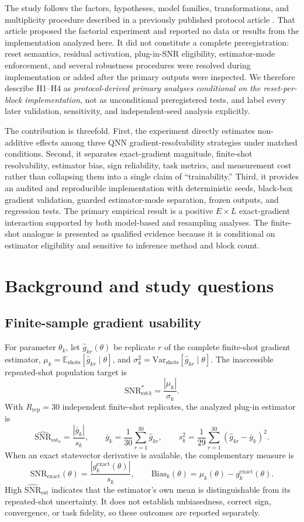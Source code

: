 \documentclass[pdflatex,sn-basic,Numbered]{sn-jnl}
\newcommand{\snrstar}{\mathrm{SNR}^{*}_{\mathrm{est}}}
\newcommand{\snrest}{\widehat{\mathrm{SNR}}_{\mathrm{est}}}
\newcommand{\snrexact}{\mathrm{SNR}_{\mathrm{exact}}}
\begin{document}
The study follows the factors, hypotheses, model families, transformations, and multiplicity procedure described in a previously published protocol article \cite{shen2026gradient}. That article proposed the factorial experiment and reported no data or results from the implementation analyzed here. It did not constitute a complete preregistration: reset semantics, residual activation, plug-in-SNR eligibility, estimator-mode enforcement, and several robustness procedures were resolved during implementation or added after the primary outputs were inspected. We therefore describe H1--H4 as \emph{protocol-derived primary analyses conditional on the reset-per-block implementation}, not as unconditional preregistered tests, and label every later validation, sensitivity, and independent-seed analysis explicitly.

The contribution is threefold. First, the experiment directly estimates non-additive effects among three QNN gradient-resolvability strategies under matched conditions. Second, it separates exact-gradient magnitude, finite-shot resolvability, estimator bias, sign reliability, task metrics, and measurement cost rather than collapsing them into a single claim of ``trainability.'' Third, it provides an audited and reproducible implementation with deterministic seeds, black-box gradient validation, guarded estimator-mode separation, frozen outputs, and regression tests. The primary empirical result is a positive $E\times L$ exact-gradient interaction supported by both model-based and resampling analyses. The finite-shot analogue is presented as qualified evidence because it is conditional on estimator eligibility and sensitive to inference method and block count.

\section{Background and study questions}

\subsection{Finite-sample gradient usability}

For parameter $\theta_k$, let $\hat g_{kr}(\theta)$ be replicate $r$ of the complete finite-shot gradient estimator, $\mu_k=\mathbb{E}_{\mathrm{shots}}[\hat g_{kr}\mid\theta]$, and $\sigma_k^2=\mathrm{Var}_{\mathrm{shots}}[\hat g_{kr}\mid\theta]$. The inaccessible repeated-shot population target is
\[
\snrstar_k=\frac{|\mu_k|}{\sigma_k}.
\]
With $R_{\mathrm{rep}}=30$ independent finite-shot replicates, the analyzed plug-in estimator is
\[
\snrest_k=\frac{|\bar g_k|}{s_k},\qquad
\bar g_k=\frac{1}{30}\sum_{r=1}^{30}\hat g_{kr},\qquad
s_k^2=\frac{1}{29}\sum_{r=1}^{30}(\hat g_{kr}-\bar g_k)^2.
\]
When an exact statevector derivative is available, the complementary measure is
\[
\snrexact(\theta)=
\frac{|g_k^{\mathrm{exact}}(\theta)|}{s_k},
\qquad
\mathrm{Bias}_k(\theta)=\mu_k(\theta)-g_k^{\mathrm{exact}}(\theta).
\]
High $\snrest$ indicates that the estimator's own mean is distinguishable from its repeated-shot uncertainty. It does not establish unbiasedness, correct sign, convergence, or task fidelity, so these outcomes are reported separately.
\end{document}
